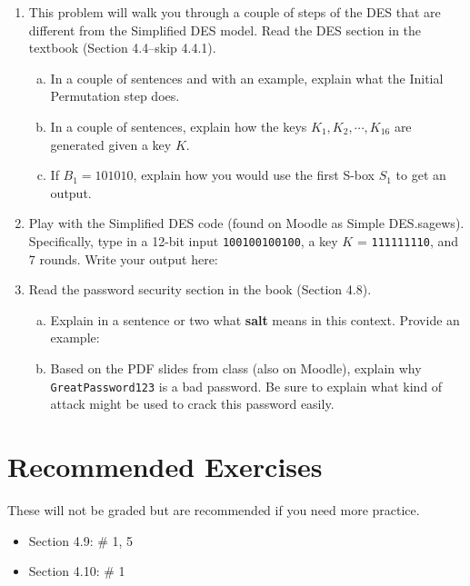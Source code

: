 \documentclass[12pt]{amsart}
\theoremstyle{plain}
\theoremstyle{definition}
\begin{document}
\begin{enumerate}[1.]
	\item This problem will walk you through a couple of steps of the DES that are different from the Simplified DES model.  Read the DES section in the textbook (Section 4.4--skip 4.4.1).
	\begin{enumerate}[a.]
		\item In a couple of sentences and with an example, explain what the Initial Permutation step does.
		\begin{framed}
		\vspace{1.8in}
		\end{framed}
		\item In a couple of sentences, explain how the keys $K_1, K_2, \cdots, K_{16}$ are generated given a key $K$.
		\begin{framed}
		\vspace{1.8in}
		\end{framed}
		\item If $B_1 = 101010$, explain how you would use the first S-box $S_1$ to get an output.
		\begin{framed}
		\vspace{2.2in}
		\end{framed}
	\end{enumerate}
	\item Play with the Simplified DES code (found on Moodle as Simple DES.sagews). Specifically, type in a 12-bit input \texttt{100100100100}, a key $K$ = \texttt{111111110}, and 7 rounds.  Write your output here:
		\begin{framed}
		\vspace{1in}
		\end{framed}
	\item Read the password security section in the book (Section 4.8).
		\begin{enumerate}[a.]
		\item Explain in a sentence or two what \textbf{salt} means in this context.  Provide an example:
		\begin{framed}
		\vspace{2.3in}
		\end{framed}
		\newpage \item Based on the PDF slides from class (also on Moodle), explain why \texttt{GreatPassword123} is a bad password.  Be sure to explain what kind of attack might be used to crack this password easily.
		\begin{framed}
		\vspace{2.3in}
		\end{framed}
		\end{enumerate}
\end{enumerate}


\section{Recommended Exercises}
\noindent These will not be graded but are recommended if you need more practice.
\begin{itemize}
	\item Section 4.9: \# 1, 5
	\item Section 4.10: \# 1
\end{itemize}
	
\end{document}
